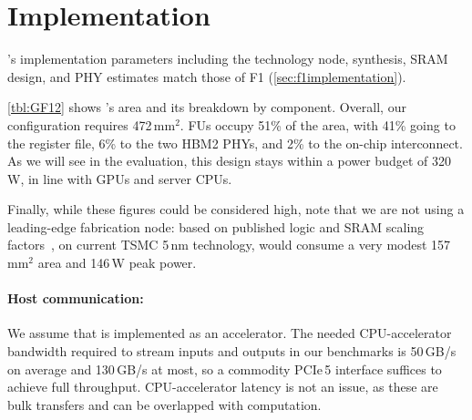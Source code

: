 \section{Implementation}\label{sec:implementation}

\name's implementation parameters including the technology node, synthesis,
SRAM design, and PHY estimates match those of F1
(\autoref{sec:f1implementation}).

\autoref{tbl:GF12} shows \name's area and its breakdown by component.
Overall, our \name configuration requires 472\,mm$^2$. %
FUs occupy 51\% of the area, with 41\% going to the register file,
6\% to the two HBM2 PHYs,
and 2\% to the on-chip interconnect.
As we will see in the evaluation, this design stays within a power budget of 320\,W,
in line with GPUs and server CPUs.

Finally, while these figures could be considered high,
note that we are not using a leading-edge fabrication node:
based on published logic and SRAM scaling factors~\cite{yeap:iedm19:tsmc-n5},
on current TSMC 5\,nm technology,
\name would consume a very modest
157\,mm$^\textrm{2}$ area and 146\,W peak power.

\paragraph{Host communication:}
We assume that \name is implemented as an accelerator.
The needed CPU-accelerator bandwidth required to stream inputs and outputs
in our benchmarks is 50\,GB/s on average and 130\,GB/s at most,
so a commodity PCIe\,5 interface suffices to achieve full throughput.
CPU-accelerator latency is not an issue, as these are bulk transfers
and can be overlapped with computation.

